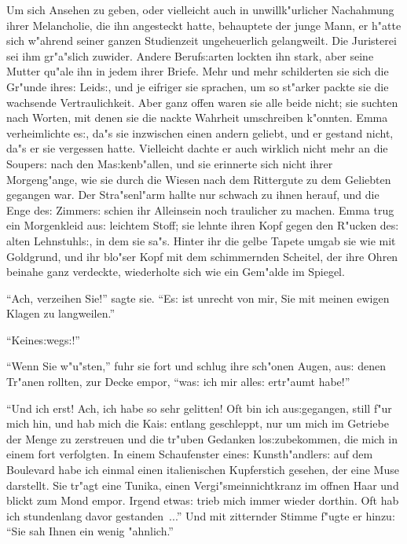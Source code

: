 \documentclass[oneside,12pt]{book}
\newcommand{\s}{s:}%
\begin{document}
Um sich Ansehen zu geben, oder vielleicht auch in unwillk"urlicher
Nachahmung ihrer Melancholie, die ihn angesteckt hatte, behauptete
der junge Mann, er h"atte sich w"ahrend seiner ganzen Studienzeit
ungeheuerlich gelangweilt. Die Juristerei sei ihm gr"a"slich
zuwider. Andere Beruf{\s}arten lockten ihn stark, aber seine
Mutter qu"ale ihn in jedem ihrer Briefe. Mehr und mehr schilderten
sie sich die Gr"unde ihre{\s} Leid{\s}, und je eifriger sie
sprachen, um so st"arker packte sie die wachsende Vertraulichkeit.
Aber ganz offen waren sie alle beide nicht; sie suchten nach
Worten, mit denen sie die nackte Wahrheit umschreiben k"onnten.
Emma verheimlichte e{\s}, da"s sie inzwischen einen andern
geliebt, und er gestand nicht, da"s er sie vergessen hatte.
Vielleicht dachte er auch wirklich nicht mehr an die Souper{\s}
nach den Ma{\s}kenb"allen, und sie erinnerte sich nicht ihrer
Morgeng"ange, wie sie durch die Wiesen nach dem Rittergute zu dem
Geliebten gegangen war. Der Stra"senl"arm hallte nur schwach zu
ihnen herauf, und die Enge de{\s} Zimmer{\s} schien ihr Alleinsein
noch traulicher zu machen. Emma trug ein Morgenkleid au{\s}
leichtem Stoff; sie lehnte ihren Kopf gegen den R"ucken de{\s}
alten Lehnstuhl{\s}, in dem sie sa"s. Hinter ihr die gelbe Tapete
umgab sie wie mit Goldgrund, und ihr blo"ser Kopf mit dem
schimmernden Scheitel, der ihre Ohren beinahe ganz verdeckte,
wiederholte sich wie ein Gem"alde im Spiegel.

"`Ach, verzeihen Sie!"' sagte sie. "`E{\s} ist unrecht von mir,
Sie mit meinen ewigen Klagen zu langweilen."'

"`Keine{\s}weg{\s}!"'

"`Wenn Sie w"u"sten,"' fuhr sie fort und schlug ihre sch"onen
Augen, au{\s} denen Tr"anen rollten, zur Decke empor, "`wa{\s} ich
mir alle{\s} ertr"aumt habe!"'

"`Und ich erst! Ach, ich habe so sehr gelitten! Oft bin ich
au{\s}gegangen, still f"ur mich hin, und hab mich die Kai{\s}
entlang geschleppt, nur um mich im Getriebe der Menge zu
zerstreuen und die tr"uben Gedanken lo{\s}zubekommen, die mich in
einem fort verfolgten. In einem Schaufenster eine{\s}
Kunsth"andler{\s} auf dem Boulevard habe ich einmal einen
italienischen Kupferstich gesehen, der eine Muse darstellt. Sie
tr"agt eine Tunika, einen Vergi"smeinnichtkranz im offnen Haar und
blickt zum Mond empor. Irgend etwa{\s} trieb mich immer wieder
dorthin. Oft hab ich stundenlang davor gestanden~..."' Und mit
zitternder Stimme f"ugte er hinzu: "`Sie sah Ihnen ein wenig
"ahnlich."'
\end{document}

